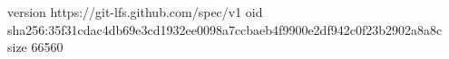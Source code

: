 version https://git-lfs.github.com/spec/v1
oid sha256:35f31cdac4db69e3cd1932ee0098a7ccbaeb4f9900e2df942c0f23b2902a8a8c
size 66560
